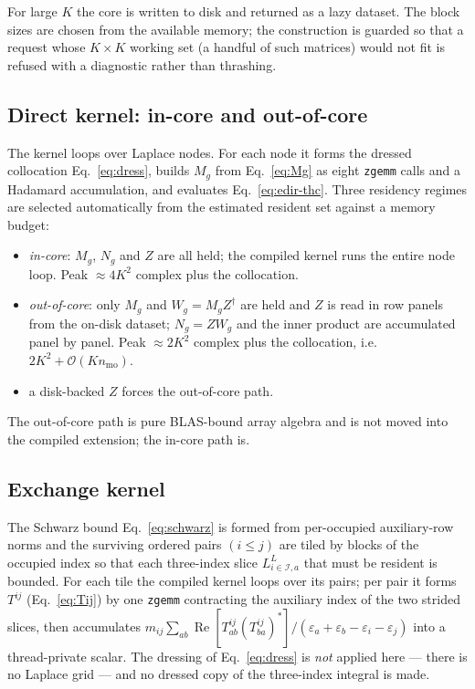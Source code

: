 \documentclass[aip,jcp,amsmath,amssymb,preprint,superscriptaddress]{revtex4-2}%
\newcommand{\re}{\operatorname{Re}}
\newcommand{\Ord}[1]{\mathcal{O}\!\left(#1\right)}
\begin{document}
For large $K$ the core is written to disk and returned as a lazy dataset.
The block sizes are chosen from the available memory; the construction is
guarded so that a request whose $K\times K$ working set (a handful of such
matrices) would not fit is refused with a diagnostic rather than thrashing.

\subsection{Direct kernel: in-core and out-of-core}

The kernel loops over Laplace nodes. For each node it forms the dressed
collocation Eq.~\eqref{eq:dress}, builds $M_g$ from Eq.~\eqref{eq:Mg} as
eight \texttt{zgemm} calls and a Hadamard accumulation, and evaluates
Eq.~\eqref{eq:edir-thc}. Three residency regimes are selected automatically
from the estimated resident set against a memory budget:
\begin{itemize}
\item \emph{in-core}: $M_g$, $N_g$ and $Z$ are all held; the compiled
  kernel runs the entire node loop. Peak $\approx 4K^2$ complex plus the
  collocation.
\item \emph{out-of-core}: only $M_g$ and $W_g=M_g Z^{\dagger}$ are held and
  $Z$ is read in row panels from the on-disk dataset; $N_g=Z W_g$ and the
  inner product are accumulated panel by panel. Peak $\approx 2K^2$ complex
  plus the collocation, i.e.\ $2K^2+\Ord{K n_{\mathrm{mo}}}$.
\item a disk-backed $Z$ forces the out-of-core path.
\end{itemize}
The out-of-core path is pure BLAS-bound array algebra and is not moved into
the compiled extension; the in-core path is.

\subsection{Exchange kernel}

The Schwarz bound Eq.~\eqref{eq:schwarz} is formed from per-occupied
auxiliary-row norms and the surviving ordered pairs $(i\le j)$ are tiled by
blocks of the occupied index so that each three-index slice
$L^{L}_{i\in\mathcal{I},a}$ that must be resident is bounded. For each tile
the compiled kernel loops over its pairs; per pair it forms $T^{ij}$
(Eq.~\eqref{eq:Tij}) by one \texttt{zgemm} contracting the auxiliary index
of the two strided slices, then accumulates
$m_{ij}\sum_{ab}\re[T^{ij}_{ab}(T^{ij}_{ba})^{*}]/
       (\varepsilon_a+\varepsilon_b-\varepsilon_i-\varepsilon_j)$
into a thread-private scalar. The dressing of Eq.~\eqref{eq:dress} is
\emph{not} applied here --- there is no Laplace grid --- and no dressed copy
of the three-index integral is made.
\end{document}

